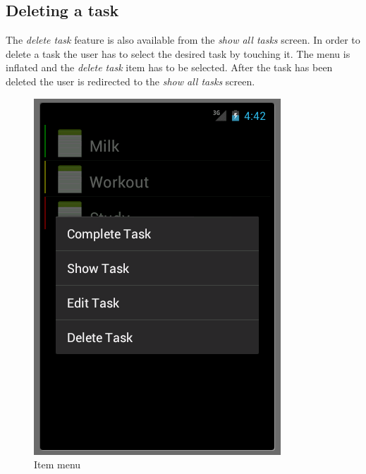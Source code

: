 \subsection{Deleting a task}
The \emph{delete task} feature is also available from the \emph{show all tasks}
screen. In order to delete a task the user has to select the desired task by
touching it. The menu is inflated and the \emph{delete task} item has to be
selected. After the task has been deleted the user is redirected to the
\emph{show all tasks} screen.
 \begin{figure}[h]
  \caption{Item menu}
  \center
  	\includegraphics[scale=0.25]{../resources/item-menu.png}
\end{figure}

